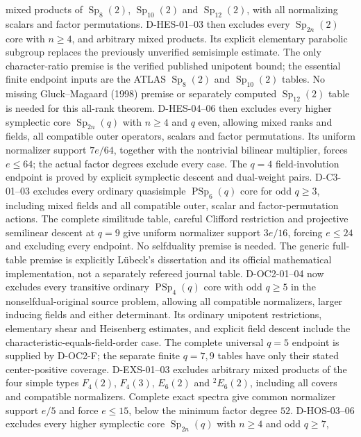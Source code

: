 \documentclass[11pt]{article}
\theoremstyle{remark}\newtheorem{remark}[theorem]{Remark}
\begin{document}
mixed products of $\operatorname{Sp}_8(2)$, $\operatorname{Sp}_{10}(2)$
and $\operatorname{Sp}_{12}(2)$, with all normalizing scalars and factor
permutations. D-HES-01--03 then excludes every
$\operatorname{Sp}_{2n}(2)$ core with $n\ge4$, and arbitrary mixed products.
Its explicit elementary parabolic subgroup replaces the previously
unverified semisimple estimate. The only character-ratio premise is the
verified published unipotent bound; the essential finite endpoint inputs
are the ATLAS $\operatorname{Sp}_8(2)$ and $\operatorname{Sp}_{10}(2)$
tables. No missing Gluck--Magaard (1998) premise or separately computed
$\operatorname{Sp}_{12}(2)$ table is needed for this all-rank theorem.
D-HES-04--06 then excludes every higher symplectic core
$\operatorname{Sp}_{2n}(q)$ with $n\ge4$ and $q$ even, allowing mixed
ranks and fields, all compatible outer operators, scalars and factor
permutations. Its uniform normalizer support $7e/64$, together with the
nontrivial bilinear multiplier, forces $e\le64$; the actual factor
degrees exclude every case. The $q=4$ field-involution endpoint is
proved by explicit symplectic descent and dual-weight pairs.
D-C3-01--03 excludes every ordinary quasisimple
$\operatorname{PSp}_6(q)$ core for odd $q\ge3$, including mixed
fields and all compatible outer, scalar and factor-permutation actions.
The complete similitude table, careful Clifford restriction and
projective semilinear descent at $q=9$ give uniform normalizer support
$3e/16$, forcing $e\le24$ and excluding every endpoint. No selfduality
premise is needed. The generic full-table premise is explicitly
L\"ubeck's dissertation and its official mathematical implementation,
not a separately refereed journal table. D-OC2-01--04 now excludes every
transitive ordinary $\operatorname{PSp}_4(q)$ core with odd $q\ge5$
in the nonselfdual-original source problem, allowing all compatible
normalizers, larger inducing fields and either determinant. Its ordinary
unipotent restrictions, elementary shear and Heisenberg estimates, and
explicit field descent include the characteristic-equals-field-order case.
The complete universal $q=5$ endpoint is supplied by D-OC2-F; the separate
finite $q=7,9$ tables have only their stated center-positive coverage.
D-EXS-01--03 excludes arbitrary mixed products of the four simple types
$F_4(2)$, $F_4(3)$, $E_6(2)$ and ${}^2E_6(2)$, including all covers and
compatible normalizers. Complete exact spectra give common normalizer
support $e/5$ and force $e\le15$, below the minimum factor degree $52$.
D-HOS-03--06 excludes every higher symplectic core
$\operatorname{Sp}_{2n}(q)$ with $n\ge4$ and odd $q\ge7$,
\end{document}
